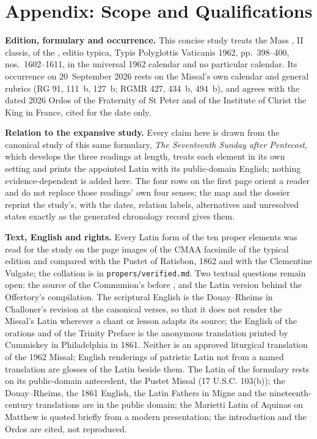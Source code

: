
\section{Appendix: Scope and Qualifications}

{\footnotesize
\textbf{Edition, formulary and occurrence.} This concise study treats the Mass
, II classis, of the
, editio typica, Typis Polyglottis Vaticanis 1962,
pp.~398--400, nos.~1602--1611, in the universal 1962 calendar and no particular
calendar. Its occurrence on 20~September 2026 rests on the Missal's own
calendar and general rubrics (RG 91, 111~b, 127~b; RGMR 427, 434~b, 494~b), and
agrees with the dated 2026 Ordos of the Fraternity of St Peter and of the
Institute of Christ the King in France, cited for the date only.

\textbf{Relation to the expansive study.} Every claim here is drawn from the
canonical study of this same formulary, \textit{The Seventeenth Sunday after
Pentecost}, which develops the three readings at length, treats each element in
its own setting and prints the appointed Latin with its public-domain English;
nothing evidence-dependent is added here. The four rows on the first page
orient a reader and do not replace those readings' own four senses; the map and
the dossier reprint the study's, with the dates, relation labels, alternatives
and unresolved states exactly as the generated chronology record gives them.

\textbf{Text, English and rights.} Every Latin form of the ten proper elements
was read for the study on the page images of the CMAA facsimile of the typical
edition and compared with the Pustet  of Ratisbon, 1862
and with the
Clementine Vulgate; the collation is in \texttt{propers/verified.md}. Two textual questions remain
open: the source of the Communion's  before , and the
Latin version behind the Offertory's compilation. The scriptural English is the
Douay--Rheims in Challoner's revision at the canonical verses, so that
it does not render the Missal's Latin wherever a chant or lesson adapts its
source; the English of the orations and of the Trinity Preface is the anonymous
translation printed by Cummiskey in Philadelphia in 1861. Neither is an
approved liturgical translation of the 1962 Missal; English renderings of
patristic Latin not from a named translation are glosses of the Latin beside
them. The Latin of the formulary rests on its public-domain antecedent, the
Pustet Missal (17 U.S.C. 103(b)); the Douay--Rheims, the 1861 English, the
Latin Fathers in Migne and the nineteenth-century translations are in the
public domain; the Marietti Latin of Aquinas on Matthew is quoted briefly from
a modern presentation; the  introduction and the
Ordos are cited, not reproduced.

}
